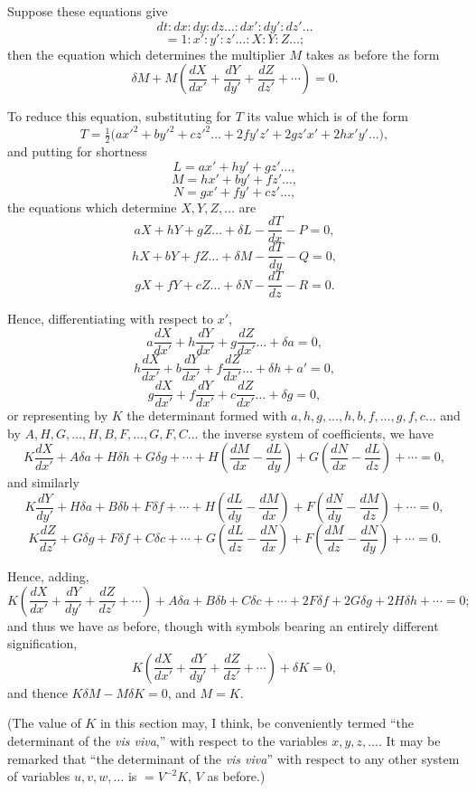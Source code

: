 \documentclass[12pt,a4paper]{article}
\begin{document}
Suppose these equations give
\[
dt : dx : dy : dz \ldots : dx' : dy' : dz' \ldots
\]
\[
= 1 : x' : y' : z' \ldots : X : Y : Z \ldots ;
\]
then the equation which determines the multiplier $M$ takes as before the form
\[
\delta M + M\left(\frac{dX}{dx'} + \frac{dY}{dy'} + \frac{dZ}{dz'} + \cdots\right) = 0.
\]

To reduce this equation, substituting for $T$ its value which is of the form
\[
T = \tfrac12\bigl(a{x'}^2 + b{y'}^2 + c{z'}^2 \ldots + 2f y' z' + 2g z' x' + 2h x' y' \ldots \bigr),
\]
and putting for shortness
\[
L = a x' + h y' + g z' \ldots,
\]
\[
M = h x' + b y' + f z' \ldots,
\]
\[
N = g x' + f y' + c z' \ldots,
\]
the equations which determine $X, Y, Z, \ldots$ are
\[
aX + hY + gZ \ldots + \delta L - \frac{dT}{dx} - P = 0,
\]
\[
hX + bY + fZ \ldots + \delta M - \frac{dT}{dy} - Q = 0,
\]
\[
gX + fY + cZ \ldots + \delta N - \frac{dT}{dz} - R = 0.
\]

Hence, differentiating with respect to $x'$,
\[
a\frac{dX}{dx'} + h\frac{dY}{dx'} + g\frac{dZ}{dx'} \ldots + \delta a = 0,
\]
\[
h\frac{dX}{dx'} + b\frac{dY}{dx'} + f\frac{dZ}{dx'} \ldots + \delta h + a' = 0,
\]
\[
g\frac{dX}{dx'} + f\frac{dY}{dx'} + c\frac{dZ}{dx'} \ldots + \delta g = 0,
\]
or representing by $K$ the determinant formed with $a, h, g, \ldots, h, b, f, \ldots, g, f, c \ldots$ and by $A, H, G, \ldots, H, B, F, \ldots, G, F, C \ldots$ the inverse system of coefficients, we have
\[
K\frac{dX}{dx'} + A\delta a + H\delta h + G\delta g + \cdots + H\left(\frac{dM}{dx} - \frac{dL}{dy}\right) + G\left(\frac{dN}{dx} - \frac{dL}{dz}\right) + \cdots = 0,
\]
and similarly
\[
K\frac{dY}{dy'} + H\delta a + B\delta b + F\delta f + \cdots + H\left(\frac{dL}{dy} - \frac{dM}{dx}\right) + F\left(\frac{dN}{dy} - \frac{dM}{dz}\right) + \cdots = 0,
\]
\[
K\frac{dZ}{dz'} + G\delta g + F\delta f + C\delta c + \cdots + G\left(\frac{dL}{dz} - \frac{dN}{dx}\right) + F\left(\frac{dM}{dz} - \frac{dN}{dy}\right) + \cdots = 0.
\]

Hence, adding,
\[
K\left(\frac{dX}{dx'} + \frac{dY}{dy'} + \frac{dZ}{dz'} + \cdots\right) + A\delta a + B\delta b + C\delta c + \cdots + 2F\delta f + 2G\delta g + 2H\delta h + \cdots = 0;
\]
and thus we have as before, though with symbols bearing an entirely different signification,
\[
K\left(\frac{dX}{dx'} + \frac{dY}{dy'} + \frac{dZ}{dz'} + \cdots\right) + \delta K = 0,
\]
and thence $K\delta M - M\delta K = 0$, and $M = K$.

(The value of $K$ in this section may, I think, be conveniently termed ``the determinant of the \emph{vis viva},'' with respect to the variables $x, y, z, \ldots$. It may be remarked that ``the determinant of the \emph{vis viva}'' with respect to any other system of variables $u, v, w, \ldots$ is $= V^{-2} K$, $V$ as before.)
\end{document}

